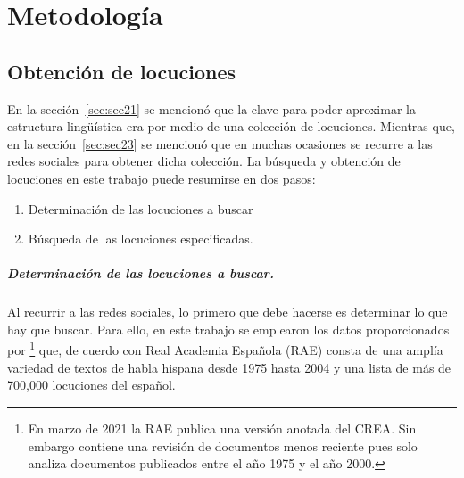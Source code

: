 \chapter{Metodología}
\label{ch:chap3}

\section{Obtención de locuciones}

En la sección~\ref{sec:sec21} se mencionó que la clave para poder aproximar la estructura lingüística era por medio de una colección de locuciones. Mientras que, en la sección~\ref{sec:sec23} se mencionó que en muchas ocasiones se recurre a las redes sociales para obtener dicha colección. La búsqueda y obtención de locuciones en este trabajo puede resumirse en dos pasos:

\begin{enumerate}
	\item Determinación de las locuciones a buscar
	\item Búsqueda de las locuciones especificadas.
\end{enumerate}

\paragraph{Determinación de las locuciones a buscar.} Al recurrir a las redes sociales, lo primero que debe hacerse es determinar lo que hay que buscar. Para ello, en este trabajo se emplearon los datos proporcionados por \cite{crearae}\footnote{En marzo de 2021 la RAE publica una versión anotada del CREA. Sin embargo contiene una revisión de documentos menos reciente pues solo analiza documentos publicados entre el año 1975 y el año 2000.} que, de cuerdo con Real Academia Española (RAE) consta de una amplía variedad de textos de habla hispana desde 1975 hasta 2004 y una lista de más de 700,000 locuciones del español.

